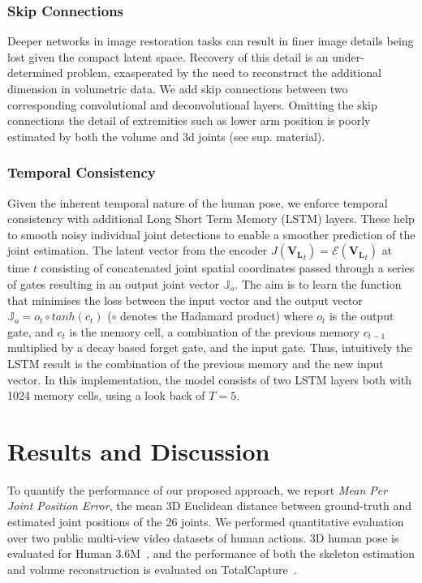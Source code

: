 \documentclass{bmvc2k}
\newcommand{\squeezeup}{\vspace{-2mm}}
\begin{document}
\squeezeup
\squeezeup

\subsubsection{Skip Connections}
Deeper networks in image restoration tasks can result in finer image details being lost given the compact latent space. Recovery of this detail is an under-determined problem, exasperated by the need to reconstruct the additional dimension in volumetric data. We add skip connections between two corresponding convolutional and deconvolutional layers. 
Omitting the skip connections the detail of extremities such as lower arm position is poorly estimated by both the volume and 3d joints (see sup. material).
\squeezeup
\squeezeup

\subsubsection{Temporal Consistency}
\label{sec:TempConsistency}
Given the inherent temporal nature of the human pose, we enforce temporal consistency with additional Long Short Term Memory (LSTM) layers. These help to smooth noisy individual joint detections to enable a smoother prediction of the joint estimation. The latent vector from the encoder $J(\mathbf{V_L}_t) = \mathcal{E}(\mathbf{V_L}_t)$ at time $t$ consisting of concatenated joint spatial coordinates passed through a series of gates resulting in an output joint vector $\mathbb{J}_o$. The aim is to learn the function that minimises the loss between the input vector and the output vector $\mathbb{J}_o = o_t \circ tanh(c_t)$ ($\circ$ denotes the Hadamard product) where $o_t$ is the output gate, and $c_t$ is the memory cell, a combination of the previous memory $c_{t-1}$ multiplied by a decay based forget gate, and the input gate. Thus, intuitively the LSTM result is the combination of the previous memory and the new input vector. In this implementation, the model consists of two LSTM layers both with 1024 memory cells, using a look back of $T = 5$.

\squeezeup
\squeezeup
\section{Results and Discussion}

\label{sec:TCSetup}
To quantify the performance of our proposed approach, we report \emph{Mean Per Joint Position Error}, the mean 3D Euclidean distance between ground-truth and estimated joint positions of the 26 joints. We performed quantitative evaluation over two public multi-view video datasets of human actions. 3D human pose is evaluated for Human 3.6M~\cite{h36m_pami}, and the performance of both the skeleton estimation and volume reconstruction is evaluated on TotalCapture~\cite{trumble_total_2017}.
\end{document}

